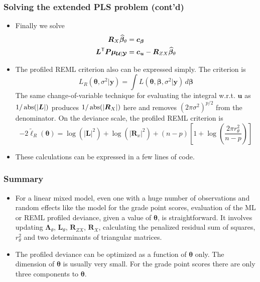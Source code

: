 \documentclass[dvipsnames,pdflatex,beamer]{beamer}
\newcommand{\bLt}{\ensuremath{\bm\Lambda_\theta}}
\begin{document}
\begin{frame}
  \frametitle{Solving the extended PLS problem (cont'd)}
  \begin{itemize}
  \item Finally we solve
    \begin{align*}
      \bm R_X\widehat{\bm\beta}_\theta&=\bm c_{\bm\beta}\\
      \bm L^\mathsf{T}\bm P\bm\mu_{\bm{\mathcal{U}}|\bm{\mathcal{Y}}}&=\bm c_{\bm u}-\bm R_{ZX}\widehat{\bm\beta}_\theta
    \end{align*}
  \item The profiled REML criterion also can be expressed simply.
    The criterion is
    \begin{displaymath}
      L_R(\bm\theta,\sigma^2|\bm y)=\int L(\bm\theta,\bm\beta,\sigma^2|\bm y)\,d\bm\beta
    \end{displaymath}
    The same change-of-variable technique for evaluating
    the integral w.r.t. $\bm u$ as $1/\operatorname{abs}(|\bm L|)$ produces 
    $1/\operatorname{abs}(|\bm R_X|)$ here and removes
    $(2\pi\sigma^2)^{p/2}$ from the denominator.  On the deviance
    scale, the profiled REML criterion is
    \begin{displaymath}
      -2\tilde{\ell}_R(\bm\theta)=\log(|\bm L|^2)+\log(|\bm R_x|^2)+
      (n-p)\left[1+\log\left(\frac{2\pi r^2_\theta}{n-p}\right)\right]
    \end{displaymath}
  \item These calculations can be expressed in a few lines of \R code.
  \end{itemize}
\end{frame}
\begin{frame}\frametitle{Summary}
  \begin{itemize}
  \item For a linear mixed model, even one with a huge number of
    observations and random effects like the model for the grade point
    scores, evaluation of the ML or REML profiled deviance, given a
    value of $\bm\theta$, is straightforward.  It involves updating
    $\bLt$, $\bm L_\theta$, $\bm R_{ZX}$, $\bm R_{X}$,
    calculating the penalized residual sum of squares,
    $r^2_\theta$ and two determinants of triangular matrices.
  \item The profiled deviance can be optimized as a function of
    $\bm\theta$ only.  The dimension of $\bm\theta$ is usually very
    small.  For the grade point scores there are only three components
    to $\bm\theta$.
  \end{itemize}
\end{frame}
\end{document}

